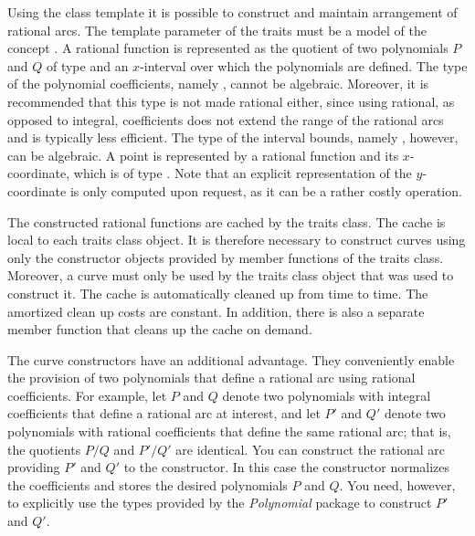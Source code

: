 Using the 
class template it is possible to construct and maintain arrangement
of rational arcs. The template parameter of the traits must be a model
of the concept . A rational function is
represented as the quotient of two polynomials $P$ and $Q$ of type
 and an $x$-interval over which
the polynomials are defined. The type of the polynomial coefficients,
namely , cannot be algebraic.
Moreover, it is recommended that this type is not made rational either,
since using rational, as opposed to integral, coefficients does not
extend the range of the rational arcs and is typically less efficient.
The type of the interval bounds, namely
, however, can be algebraic. A point is
represented by a rational function and its $x$-coordinate, which is of
type . Note that an explicit
representation of the $y$-coordinate is only computed upon request, as
it can be a rather costly operation.

The constructed rational functions are cached by the traits class. The
cache is local to each traits class object. It is therefore necessary
to construct curves using only the constructor objects provided by
member functions of the traits class.
Moreover, a curve must only be used by the traits class object that
was used to construct it. The cache is automatically cleaned up from
time to time. The amortized clean up costs are constant. In addition,
there is also a separate member function that cleans up the cache on
demand.

The curve constructors have an additional advantage. They conveniently
enable the provision of two polynomials that define a rational arc
using rational coefficients. For example, let $P$ and $Q$ denote two
polynomials with integral coefficients that define a rational arc at
interest, and let $P'$ and $Q'$ denote two polynomials with rational
coefficients that define the same rational arc; that is, the quotients
$P/Q$ and $P'/Q'$ are identical. You can construct the rational arc
providing $P'$ and $Q'$ to the constructor. In this case the
constructor normalizes the coefficients and stores the desired
polynomials $P$ and $Q$. You need, however, to explicitly use the 
types provided by the \emph{Polynomial} package to construct $P'$ and
$Q'$.

